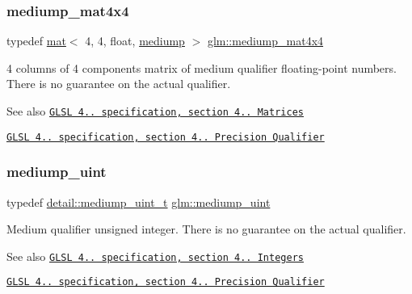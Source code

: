 \subsubsection{\texorpdfstring{mediump\+\_\+mat4x4}{mediump\_mat4x4}}
{\footnotesize\ttfamily typedef \hyperlink{structglm_1_1mat}{mat}$<$ 4, 4, float, \hyperlink{namespaceglm_a36ed105b07c7746804d7fdc7cc90ff25a6416f3ea0c9025fb21ed50c4d6620482}{mediump} $>$ \hyperlink{group__core__precision_ga80dd7aaae2879e86a588c36a39652ee4}{glm\+::mediump\+\_\+mat4x4}}

4 columns of 4 components matrix of medium qualifier floating-\/point numbers. There is no guarantee on the actual qualifier.

\begin{DoxySeeAlso}{See also}
\href{http://www.opengl.org/registry/doc/GLSLangSpec.4.20.8.pdf}{\tt G\+L\+SL 4.. specification, section 4.. Matrices} 

\href{http://www.opengl.org/registry/doc/GLSLangSpec.4.20.8.pdf}{\tt G\+L\+SL 4.. specification, section 4.. Precision Qualifier} 
\end{DoxySeeAlso}
\mbox{\label{group__core__precision_ga08ae38ad78ade3539fdd1d25052b8c51}} 
\subsubsection{\texorpdfstring{mediump\+\_\+uint}{mediump\_uint}}
{\footnotesize\ttfamily typedef \hyperlink{namespaceglm_1_1detail_a98f572e92099cc1b5740f1ccf1c80f8d}{detail\+::mediump\+\_\+uint\+\_\+t} \hyperlink{group__core__precision_ga08ae38ad78ade3539fdd1d25052b8c51}{glm\+::mediump\+\_\+uint}}

Medium qualifier unsigned integer. There is no guarantee on the actual qualifier.

\begin{DoxySeeAlso}{See also}
\href{http://www.opengl.org/registry/doc/GLSLangSpec.4.20.8.pdf}{\tt G\+L\+SL 4.. specification, section 4.. Integers} 

\href{http://www.opengl.org/registry/doc/GLSLangSpec.4.20.8.pdf}{\tt G\+L\+SL 4.. specification, section 4.. Precision Qualifier} 
\end{DoxySeeAlso}
\mbox{\label{group__core__precision_ga35052256be4d47b9cb80114ca043cfaf}} 
